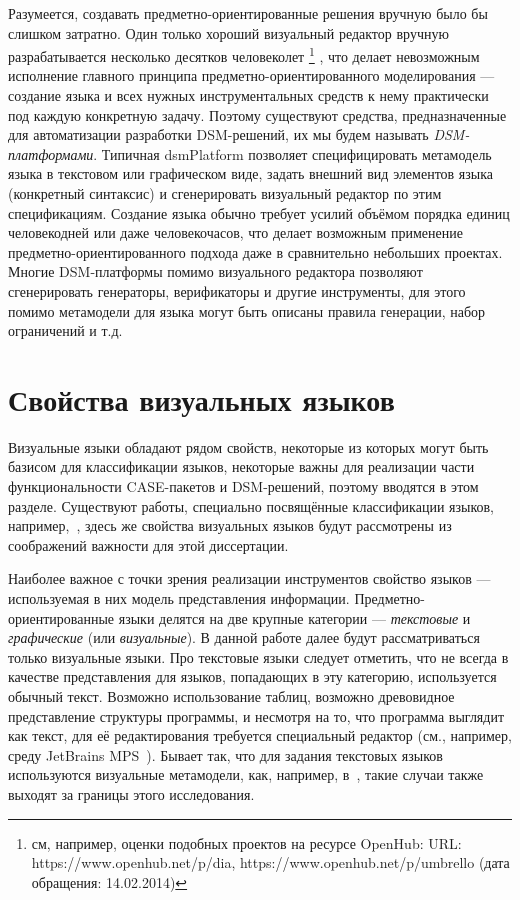 Разумеется, создавать предметно-ориентированные решения вручную было бы слишком 
затратно. Один только хороший визуальный редактор вручную разрабатывается 
несколько десятков человеколет%
\footnote{см, например, оценки подобных проектов на ресурсе OpenHub: 
URL: https://www.openhub.net/p/dia, https://www.openhub.net/p/umbrello (дата обращения: 14.02.2014)}%
, что делает невозможным исполнение главного 
принципа предметно-ориентированного моделирования --- создание языка и всех 
нужных инструментальных средств к нему практически под каждую конкретную задачу. 
Поэтому существуют средства, предназначенные для автоматизации разработки 
\ac{DSM}-решений, их мы будем называть \textit{DSM-платформами}. 
Типичная \ac{dsmPlatform} позволяет специфицировать метамодель языка в текстовом или графическом виде, задать 
внешний вид элементов языка (конкретный синтаксис) и сгенерировать визуальный 
редактор по этим спецификациям. Создание языка обычно требует усилий объёмом 
порядка единиц человекодней или даже человекочасов, что делает возможным 
применение предметно-ориентированного подхода даже в сравнительно небольших 
проектах. Многие \ac{DSM}-платформы помимо визуального редактора позволяют 
сгенерировать генераторы, верификаторы и другие инструменты, для этого помимо 
метамодели для языка могут быть описаны правила генерации, набор ограничений 
и т.д.

\section{Свойства визуальных языков}
Визуальные языки обладают рядом свойств, некоторые из которых могут быть базисом 
для классификации языков, некоторые важны для реализации части функциональности \ac{CASE}-пакетов 
и \ac{DSM}-решений, поэтому вводятся в этом разделе. Существуют работы, специально
посвящённые классификации языков, например,~\cite{costagliola2002classification},
здесь же свойства визуальных языков будут рассмотрены из соображений важности для этой диссертации.

Наиболее важное с точки зрения реализации инструментов свойство языков --- 
используемая в них модель представления информации. Предметно-ориентированные 
языки делятся на две крупные категории --- \textit{текстовые} и \textit{графические} 
(или \textit{визуальные}). В данной работе далее будут рассматриваться только визуальные 
языки. Про текстовые языки следует отметить, что не всегда в качестве представления для языков, 
попадающих в эту категорию, используется обычный текст. Возможно использование таблиц, 
возможно древовидное представление структуры программы, и несмотря на то, что программа 
выглядит как текст, для её редактирования требуется специальный редактор (см., например, среду 
JetBrains MPS~\cite{dmitriev2004language}). Бывает так, что для задания текстовых языков используются визуальные метамодели,
как, например, в~\cite{karlsch2007model}, такие случаи также выходят за границы этого исследования.

